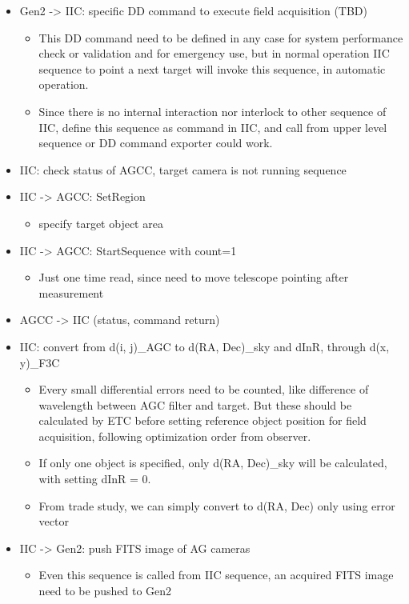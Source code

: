 \documentclass[a4paper,notitlepage]{article}
\begin{document}
\begin{itemize}
  \item Gen2 -> IIC: specific DD command to execute field acquisition (TBD)
  \begin{itemize}
    \item This DD command need to be defined in any case for system performance check or validation and for emergency use, but in normal operation IIC sequence to point a next target will invoke this sequence, in automatic operation.
    \item Since there is no internal interaction nor interlock to other sequence of IIC, define this sequence as command in IIC, and call from upper level sequence or DD command exporter could work.
  \end{itemize}
  \item IIC: check status of AGCC, target camera is not running sequence
  \item IIC -> AGCC: SetRegion 
  \begin{itemize}
    \item specify target object area
  \end{itemize}
  \item IIC -> AGCC: StartSequence with count=1
  \begin{itemize}
    \item Just one time read, since need to move telescope pointing after measurement
  \end{itemize}
  \item AGCC -> IIC (status, command return)
  \item IIC: convert from d(i, j)\_AGC to d(RA, Dec)\_sky and dInR, through d(x, y)\_F3C
  \begin{itemize}
    \item Every small differential errors need to be counted, like difference of wavelength between AGC filter and target. But these should be calculated by ETC before setting reference object position for field acquisition, following optimization order from observer.
    \item If only one object is specified, only d(RA, Dec)\_sky will be calculated, with setting dInR = 0.
    \item From trade study, we can simply convert to d(RA, Dec) only using error vector
  \end{itemize}
  \item IIC -> Gen2: push FITS image of AG cameras
  \begin{itemize}
    \item Even this sequence is called from IIC sequence, an acquired FITS image need to be pushed to Gen2
  \end{itemize}
\end{itemize}
\end{document}
